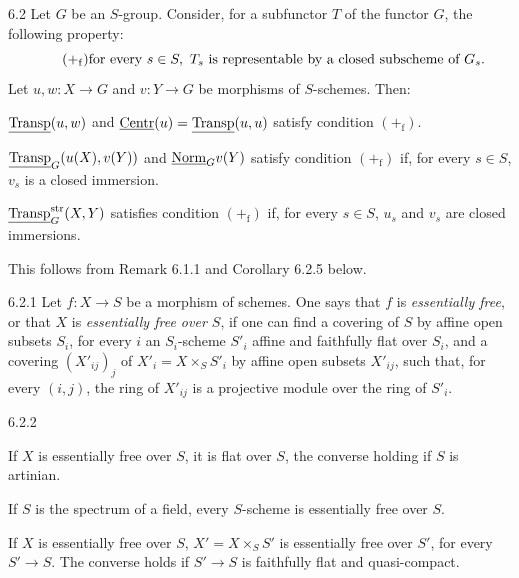 \begin{proposition}{6.2}\label{VIB.6.2}
Let $G$ be an $S$-group. Consider, for a subfunctor $T$ of the functor $G$, the following property:
\[
\tag{$+_{\mathrm f}$}
\text{for every }s\in S,\ T_s\text{ is representable by a closed subscheme of }G_s.
\]
Let $u,w:X\to G$ and $v:Y\to G$ be morphisms of $S$-schemes. Then:
\begin{enumeratei}
\item $\underline{\operatorname{Transp}}(u,w)$ and $\underline{\mathrm{Centr}}(u)=\underline{\operatorname{Transp}}(u,u)$ satisfy condition $(+_{\mathrm f})$.
\item $\underline{\operatorname{Transp}}_G(u(X),v(Y))$ and $\underline{\mathrm{Norm}}_Gv(Y)$ satisfy condition $(+_{\mathrm f})$ if, for every $s\in S$, $v_s$ is a closed immersion.
\item $\underline{\operatorname{Transp}}_G^{\mathrm{str}}(X,Y)$ satisfies condition $(+_{\mathrm f})$ if, for every $s\in S$, $u_s$ and $v_s$ are closed immersions.
\end{enumeratei}
\end{proposition}
This follows from Remark 6.1.1 and Corollary 6.2.5 below.
\begin{definition}{6.2.1}\label{VIB.6.2.1}
Let $f:X\to S$ be a morphism of schemes. One says that $f$ is \emph{essentially free}, or that $X$ is \emph{essentially free over $S$}, if one can find a covering of $S$ by affine open subsets $S_i$, for every $i$ an $S_i$-scheme $S'_i$ affine and faithfully flat over $S_i$, and a covering $(X'_{ij})_j$ of $X'_i=X\times_SS'_i$ by affine open subsets $X'_{ij}$, such that, for every $(i,j)$, the ring of $X'_{ij}$ is a projective module over the ring of $S'_i$.
\end{definition}
\begin{proposition}{6.2.2}\label{VIB.6.2.2}
\begin{enumeratea}
\item If $X$ is essentially free over $S$, it is flat over $S$, the converse holding if $S$ is artinian.
\item If $S$ is the spectrum of a field, every $S$-scheme is essentially free over $S$.
\item If $X$ is essentially free over $S$, $X'=X\times_SS'$ is essentially free over $S'$, for every $S'\to S$. The converse holds if $S'\to S$ is faithfully flat and quasi-compact.
\end{enumeratea}
\end{proposition}
